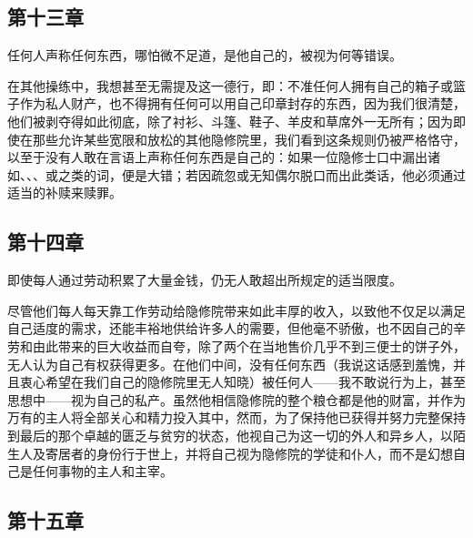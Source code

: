 
\subsection{第十三章}

任何人声称任何东西，哪怕微不足道，是他自己的，被视为何等错误。\par

在其他操练中，我想甚至无需提及这一德行，即：不准任何人拥有自己的箱子或篮子作为私人财产，也不得拥有任何可以用自己印章封存的东西，因为我们很清楚，他们被剥夺得如此彻底，除了衬衫、斗篷、鞋子、羊皮和草席外一无所有；因为即使在那些允许某些宽限和放松的其他隐修院里，我们看到这条规则仍被严格恪守，以至于没有人敢在言语上声称任何东西是自己的：如果一位隐修士口中漏出诸如、、、或之类的词，便是大错；若因疏忽或无知偶尔脱口而出此类话，他必须通过适当的补赎来赎罪。\par


\subsection{第十四章}

即使每人通过劳动积累了大量金钱，仍无人敢超出所规定的适当限度。\par

尽管他们每人每天靠工作劳动给隐修院带来如此丰厚的收入，以致他不仅足以满足自己适度的需求，还能丰裕地供给许多人的需要，但他毫不骄傲，也不因自己的辛劳和由此带来的巨大收益而自夸，除了两个在当地售价几乎不到三便士的饼子外，无人认为自己有权获得更多。在他们中间，没有任何东西（我说这话感到羞愧，并且衷心希望在我们自己的隐修院里无人知晓）被任何人——我不敢说行为上，甚至思想中——视为自己的私产。虽然他相信隐修院的整个粮仓都是他的财富，并作为万有的主人将全部关心和精力投入其中，然而，为了保持他已获得并努力完整保持到最后的那个卓越的匮乏与贫穷的状态，他视自己为这一切的外人和异乡人，以陌生人及寄居者的身份行于世上，并将自己视为隐修院的学徒和仆人，而不是幻想自己是任何事物的主人和主宰。\par


\subsection{第十五章}

